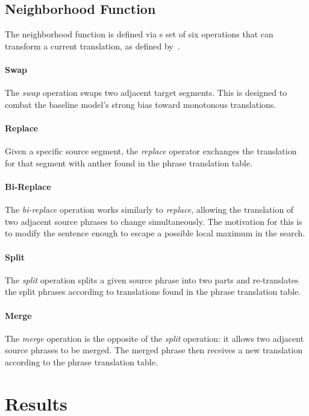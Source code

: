 \documentclass[11pt,letterpaper]{article}
\begin{document}
\subsection{Neighborhood Function}
The neighborhood function is defined via s set of six operations that can transform a current translation,
as defined by~\cite{langlais2007greedy}.

\paragraph{Swap} The \textit{swap} operation swaps two adjacent target segments. This is designed to combat
the baseline model's strong bias toward monotonous translations.

\paragraph{Replace} Given a specific source segment, the \textit{replace} operator exchanges the translation
for that segment with anther found in the phrase translation table.

\paragraph{Bi-Replace} The \textit{bi-replace} operation works similarly to \textit{replace}, allowing the
translation of two adjacent source phrases to change simultaneously. The motivation for this is to modify 
the sentence enough to escape a possible local maximum in the search.

\paragraph{Split} The \textit{split} operation splits a given source phrase into two parts and re-translates
the split phrases according to translations found in the phrase translation table.

\paragraph{Merge} The \textit{merge} operation is the opposite of the \textit{split} operation: it allows two
adjacent source phrases to be merged. The merged phrase then receives a new translation according to the phrase
translation table.


\section{Results}




\end{document}

